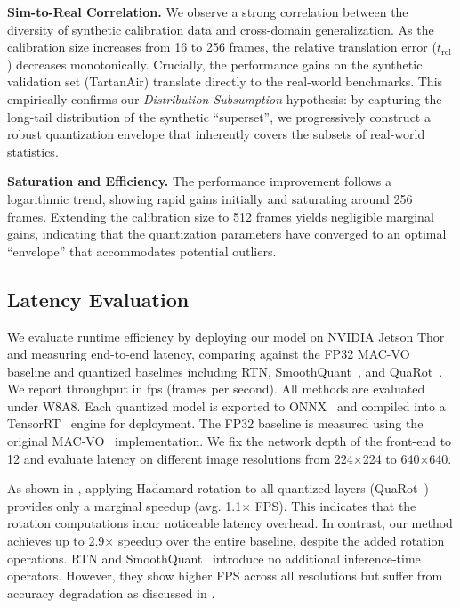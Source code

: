 \textbf{Sim-to-Real Correlation.}
We observe a strong correlation between the diversity of synthetic calibration data and cross-domain generalization. As the calibration size increases from 16 to 256 frames, the relative translation error ($t_{\mathrm{rel}}$) decreases monotonically. Crucially, the performance gains on the synthetic validation set (TartanAir) translate directly to the real-world benchmarks. This empirically confirms our \textit{Distribution Subsumption} hypothesis: by capturing the long-tail distribution of the synthetic ``superset'', we progressively construct a robust quantization envelope that inherently covers the subsets of real-world statistics.

\textbf{Saturation and Efficiency.} The performance improvement follows a logarithmic trend, showing rapid gains initially and saturating around 256 frames. Extending the calibration size to 512 frames yields negligible marginal gains, indicating that the quantization parameters have converged to an optimal ``envelope'' that accommodates potential outliers.




\subsection{Latency Evaluation}
\label{sec:latency_eval}

We evaluate runtime efficiency by deploying our model on NVIDIA Jetson Thor and measuring end-to-end latency, comparing against the FP32 MAC-VO baseline and quantized baselines including RTN, SmoothQuant~\cite{xiao2022smoothquant}, and QuaRot~\cite{ashkboos2024quarot}.
We report throughput in fps (frames per second).
All methods are evaluated under W8A8.
Each quantized model is exported to ONNX~\cite{onnx} and compiled into a TensorRT~\cite{nvidia_tensorrt} engine for deployment. The FP32 baseline is measured using the original MAC-VO~\cite{qiu2025mac} implementation. We fix the network depth of the front-end to 12 and evaluate latency on different image resolutions from 224$\times$224 to 640$\times$640.

As shown in , applying Hadamard rotation to all quantized layers (QuaRot~\cite{ashkboos2024quarot}) provides only a marginal speedup (avg. 1.1$\times$ FPS). This indicates that the rotation computations incur noticeable latency overhead. In contrast, our method achieves up to 2.9$\times$ speedup over the entire baseline, despite the added rotation operations. 
RTN and SmoothQuant~\cite{xiao2022smoothquant} introduce no additional inference-time operators. However, they show higher FPS across all resolutions but suffer from accuracy degradation as discussed in .


